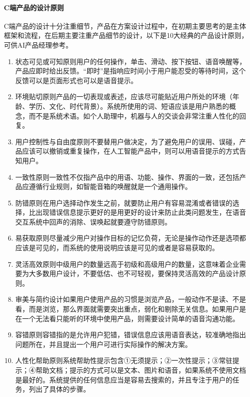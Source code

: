 \documentclass[letterpaper,10pt,english]{sphinxmanual}
\begin{document}
\paragraph{C端产品的设计原则}
\label{\detokenize{chapter_introduction/2C:c}}
C端产品的设计十分注重细节，产品在方案设计过程中，在初期主要思考的是主体框架和流程，在后期主要注重产品细节的设计，以下是10大经典的产品设计原则，可供AI产品经理参考。
\begin{enumerate}
%
\item {} 
状态可见或可知原则用户的任何操作，单击、滑动、按下按钮、语音唤醒等，产品应即时给出反馈。“即时”是指响应时间小于用户能忍受的等待时间，这个反馈可以是页面形式也可以是语音提示。

\item {} 
环境贴切原则产品的一切表现或表述，应该尽可能贴近用户所处的环境（年龄、学历、文化、时代背景）。系统所使用的词、短语应该是用户熟悉的概念，而不是系统术语。如个人助理中，机器与人的交谈会非常注重人性化的回复。

\item {} 
用户控制性与自由度原则不要替用户做决定，为了避免用户的误用、误碰，产品应该可以撤销或重复操作，在人工智能产品中，则可以用语音提示的方式告知用户。

\item {} 
一致性原则一致性不仅指产品中的用语、功能、操作、界面的一致，还包括产品应遵循行业规则，如智能音箱的唤醒就是一个通用操作。

\item {} 
防错原则在用户选择动作发生之前，就要防止用户有容易混淆或者错误的选择，比出现错误信息提示更好的是用更好的设计来防止此类问题发生，在语音交互系统中回声的消除、误唤起就要遵守防错原则。

\item {} 
易获取原则尽量减少用户对操作目标的记忆负荷，无论是操作动作还是选项都应该是可见的，而系统的使用说明应该是可见的或者是容易获取的。

\item {} 
灵活高效原则中级用户的数量远高于初级和高级用户的数量，这意味着企业需要为大多数用户设计，不要低估、也不可轻视，要保持灵活高效的产品设计原则。

\item {} 
审美与简约设计如果用户使用产品的习惯是浏览产品，一般动作不是读、不是看，而是浏览，那么界面就需要突出重点，弱化和剔除无关信息。如果用户是在一个无法看只能听的环境中使用产品，则需要设计简单的语音沟通功能。

\item {} 
容错原则容错指的是允许用户犯错，错误信息应该用语音表达，较准确地指出问题所在，并且提出一个用户可进行实际操作的解决方案。

\item {} 
人性化帮助原则系统帮助性提示包含①无须提示；②一次性提示；③常驻提示；④帮助文档；提示的方式可以是文本、图片和语音，如果系统不使用文档是最好的。系统提供的任何信息应当是容易去搜索的，并且专注于用户的任务，列出了具体的步骤。

\end{enumerate}
\end{document}
